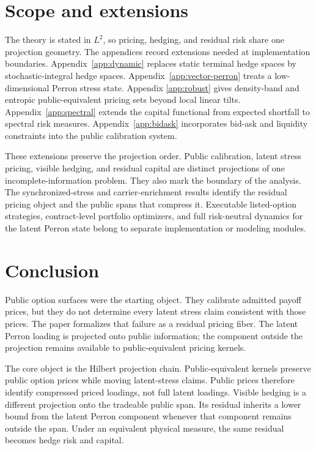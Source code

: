 \documentclass[11pt,a4paper]{amsart}
\theoremstyle{plain}
\theoremstyle{definition}
\theoremstyle{remark}
\begin{document}
\section{Scope and extensions}\label{sec:scope}

The theory is stated in \(L^2\), so pricing, hedging, and residual risk share one projection
geometry.  The appendices record extensions needed at implementation boundaries.
Appendix~\ref{app:dynamic} replaces static terminal hedge spaces by stochastic-integral hedge
spaces.  Appendix~\ref{app:vector-perron} treats a low-dimensional Perron stress state.  Appendix
\ref{app:robust} gives density-band and entropic public-equivalent pricing sets beyond local
linear tilts.  Appendix~\ref{app:spectral} extends the capital functional from expected shortfall
to spectral risk measures.  Appendix~\ref{app:bidask} incorporates bid-ask and liquidity
constraints into the public calibration system.

These extensions preserve the projection order.  Public calibration, latent stress pricing,
visible hedging, and residual capital are distinct projections of one incomplete-information
problem.  They also mark the boundary of the analysis.  The synchronized-stress and
carrier-enrichment results identify the residual pricing object and the public spans that compress
it.  Executable listed-option strategies, contract-level portfolio optimizers, and full
risk-neutral dynamics for the latent Perron state belong to separate implementation or modeling
modules.

\section{Conclusion}\label{sec:conclusion}

Public option surfaces were the starting object.  They calibrate admitted payoff prices, but they
do not determine every latent stress claim consistent with those prices.  The paper formalizes that
failure as a residual pricing fiber.  The latent Perron loading is projected onto public
information; the component outside the projection remains available to public-equivalent pricing
kernels.

The core object is the Hilbert projection chain.  Public-equivalent kernels preserve public option
prices while moving latent-stress claims.  Public prices therefore identify compressed priced
loadings, not full latent loadings.  Visible hedging is a different projection onto the tradeable
public span.  Its residual inherits a lower bound from the latent Perron component whenever that
component remains outside the span.  Under an equivalent physical measure, the same residual becomes
hedge risk and capital.
\end{document}
